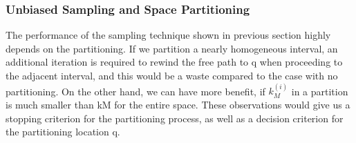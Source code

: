 \documentclass[acmtog]{acmart}
\begin{document}
\subsubsection{Unbiased Sampling and Space Partitioning}
The performance of the sampling technique shown in previous section highly depends on the partitioning. If we partition a nearly homogeneous interval, an additional iteration is required to rewind the free path to q when proceeding to the adjacent interval, and this
would be a waste compared to the case with no partitioning. On the other hand, we can have more benefit, if $k_M^{(i)}$ in a partition is much smaller than kM for the entire space. These observations would give us a stopping criterion for the partitioning process, as well as a decision criterion for the partitioning location q.
\end{document}
